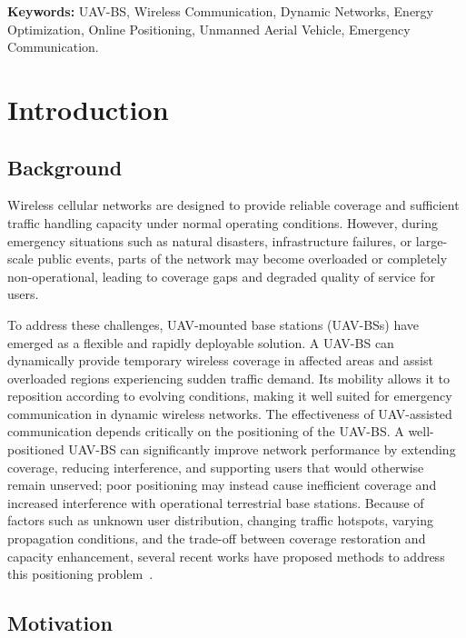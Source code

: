 \documentclass[12pt]{report}
\begin{document}
\vspace{0.5cm}

\noindent \textbf{Keywords:} UAV-BS, Wireless Communication, Dynamic Networks, Energy Optimization, Online Positioning, Unmanned Aerial Vehicle, Emergency Communication.

\chapter{Introduction}
\label{ch:intro}

\section{Background}

Wireless cellular networks are designed to provide reliable coverage and sufficient traffic handling capacity under normal operating conditions. However, during emergency situations such as natural disasters, infrastructure failures, or large-scale public events, parts of the network may become overloaded or completely non-operational, leading to coverage gaps and degraded quality of service for users.

To address these challenges, UAV-mounted base stations (UAV-BSs) have emerged as a flexible and rapidly deployable solution. A UAV-BS can dynamically provide temporary wireless coverage in affected areas and assist overloaded regions experiencing sudden traffic demand. Its mobility allows it to reposition according to evolving conditions, making it well suited for emergency communication in dynamic wireless networks. The effectiveness of UAV-assisted communication depends critically on the positioning of the UAV-BS. A well-positioned UAV-BS can significantly improve network performance by extending coverage, reducing interference, and supporting users that would otherwise remain unserved; poor positioning may instead cause inefficient coverage and increased interference with operational terrestrial base stations. Because of factors such as unknown user distribution, changing traffic hotspots, varying propagation conditions, and the trade-off between coverage restoration and capacity enhancement, several recent works have proposed methods to address this positioning problem~\cite{pijnappel2024online, mozaffari2019tutorial, kalantari2016number}.

\section{Motivation}
\end{document}
